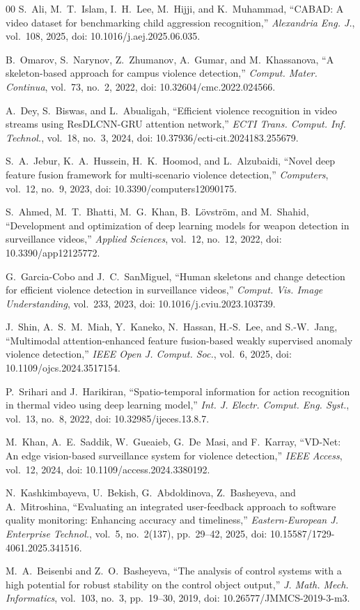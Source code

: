 \documentclass[conference]{IEEEtran}
\begin{document}
\begin{thebibliography}{00}
 S.~Ali, M.~T.~Islam, I.~H.~Lee, M.~Hijji, and K.~Muhammad, ``CABAD: A video dataset for benchmarking child aggression recognition,'' \textit{Alexandria Eng. J.}, vol.~108, 2025, doi: 10.1016/j.aej.2025.06.035.

 B.~Omarov, S.~Narynov, Z.~Zhumanov, A.~Gumar, and M.~Khassanova, ``A skeleton-based approach for campus violence detection,'' \textit{Comput. Mater. Continua}, vol.~73, no.~2, 2022, doi: 10.32604/cmc.2022.024566.

 A.~Dey, S.~Biswas, and L.~Abualigah, ``Efficient violence recognition in video streams using ResDLCNN-GRU attention network,'' \textit{ECTI Trans. Comput. Inf. Technol.}, vol.~18, no.~3, 2024, doi: 10.37936/ecti-cit.2024183.255679.

 S.~A.~Jebur, K.~A.~Hussein, H.~K.~Hoomod, and L.~Alzubaidi, ``Novel deep feature fusion framework for multi-scenario violence detection,'' \textit{Computers}, vol.~12, no.~9, 2023, doi: 10.3390/computers12090175.

 S.~Ahmed, M.~T.~Bhatti, M.~G.~Khan, B.~L\"{o}vstr\"{o}m, and M.~Shahid, ``Development and optimization of deep learning models for weapon detection in surveillance videos,'' \textit{Applied Sciences}, vol.~12, no.~12, 2022, doi: 10.3390/app12125772.

 G.~Garcia-Cobo and J.~C.~SanMiguel, ``Human skeletons and change detection for efficient violence detection in surveillance videos,'' \textit{Comput. Vis. Image Understanding}, vol.~233, 2023, doi: 10.1016/j.cviu.2023.103739.

 J.~Shin, A.~S.~M.~Miah, Y.~Kaneko, N.~Hassan, H.-S.~Lee, and S.-W.~Jang, ``Multimodal attention-enhanced feature fusion-based weakly supervised anomaly violence detection,'' \textit{IEEE Open J. Comput. Soc.}, vol.~6, 2025, doi: 10.1109/ojcs.2024.3517154.

 P.~Srihari and J.~Harikiran, ``Spatio-temporal information for action recognition in thermal video using deep learning model,'' \textit{Int. J. Electr. Comput. Eng. Syst.}, vol.~13, no.~8, 2022, doi: 10.32985/ijeces.13.8.7.

 M.~Khan, A.~E.~Saddik, W.~Gueaieb, G.~De~Masi, and F.~Karray, ``VD-Net: An edge vision-based surveillance system for violence detection,'' \textit{IEEE Access}, vol.~12, 2024, doi: 10.1109/access.2024.3380192.

 N.~Kashkimbayeva, U.~Bekish, G.~Abdoldinova, Z.~Basheyeva, and A.~Mitroshina, ``Evaluating an integrated user-feedback approach to software quality monitoring: Enhancing accuracy and timeliness,'' \textit{Eastern-European J. Enterprise Technol.}, vol.~5, no.~2(137), pp.~29--42, 2025, doi: 10.15587/1729-4061.2025.341516.

 M.~A.~Beisenbi and Z.~O.~Basheyeva, ``The analysis of control systems with a high potential for robust stability on the control object output,'' \textit{J. Math. Mech. Informatics}, vol.~103, no.~3, pp.~19--30, 2019, doi: 10.26577/JMMCS-2019-3-m3.

\end{thebibliography}
\end{document}
